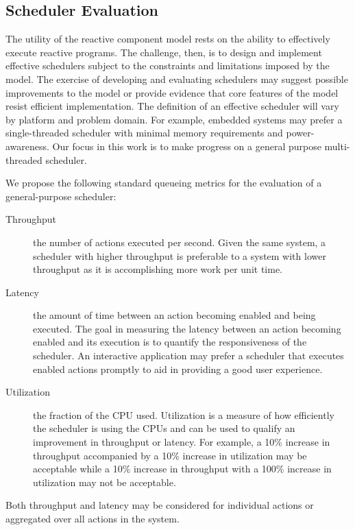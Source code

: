 \subsection{Scheduler Evaluation}

The utility of the reactive component model rests on the ability to effectively execute reactive programs.
The challenge, then, is to design and implement effective schedulers subject to the constraints and limitations imposed by the model.
The exercise of developing and evaluating schedulers may suggest possible improvements to the model or provide evidence that core features of the model resist efficient implementation.
The definition of an effective scheduler will vary by platform and problem domain.
For example, embedded systems may prefer a single-threaded scheduler with minimal memory requirements and power-awareness.
Our focus in this work is to make progress on a general purpose multi-threaded scheduler.

We propose the following standard queueing metrics for the evaluation of a general-purpose scheduler:
\begin{description}
\item[Throughput] the number of actions executed per second.
Given the same system, a scheduler with higher throughput is preferable to a system with lower throughput as it is accomplishing more work per unit time.
\item[Latency] the amount of time between an action becoming enabled and being executed.
The goal in measuring the latency between an action becoming enabled and its execution is to quantify the responsiveness of the scheduler.
An interactive application may prefer a scheduler that executes enabled actions promptly to aid in providing a good user experience.
\item[Utilization] the fraction of the CPU used.
Utilization is a measure of how efficiently the scheduler is using the CPUs and can be used to qualify an improvement in throughput or latency.
For example, a 10\% increase in throughput accompanied by a 10\% increase in utilization may be acceptable while a 10\% increase in throughput with a 100\% increase in utilization may not be acceptable.
\end{description}
Both throughput and latency may be considered for individual actions or aggregated over all actions in the system.

